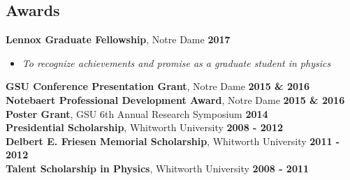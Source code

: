 \documentclass[margin]{res}
\begin{document}
\begin{resume}
\section{Awards}

{\bf Lennox Graduate Fellowship}, Notre Dame \hfill {\bf 2017}
\begin{itemize}  \itemsep -2pt %
     \item[] \textit{\small{To recognize achievements and promise as a graduate student in physics}}
\end{itemize} \vspace{-12pt}
{\bf GSU Conference Presentation Grant}, Notre Dame  \hfill {\bf 2015 \& 2016}\\
{\bf Notebaert Professional Development Award}, Notre Dame \hfill {\bf 2015 \& 2016}\\
{\bf Poster Grant}, GSU 6th Annual Research Symposium \hfill {\bf 2014}\\
{\bf Presidential Scholarship}, Whitworth University \hfill {\bf2008 - 2012}\\
{\bf Delbert E. Friesen Memorial Scholarship}, Whitworth University \hfill {\bf2011 - 2012}\\
{\bf Talent Scholarship in Physics}, Whitworth University \hfill {\bf2008 - 2011}









\end{resume}
\end{document}
